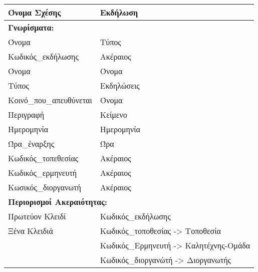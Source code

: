 \begin{tabular}{|p{6cm}|p{8cm}|}
  \hline
  Όνομα Σχέσης          & Εκδήλωση                              \\ \hline
  \multicolumn{2}{|l|}{\textbf{Γνωρίσματα:}}                    \\ \hline
  Όνομα                 & Τύπος                                 \\ \hline
  Κωδικός\_εκδήλωσης     & Ακέραιος                              \\ \hline
  Όνομα                 & Όνομα                                 \\ \hline
  Τύπος                 & Εκδηλώσεις                            \\ \hline
  Κοινό\_που\_απευθύνεται & Όνομα                                 \\ \hline
  Περιγραφή             & Κείμενο                               \\ \hline
  Ημερομηνία            & Ημερομηνία                            \\ \hline
  Ώρα\_έναρξης           & Ώρα                                   \\ \hline
  Κωδικός\_τοπεθεσίας    & Ακέραιος                              \\ \hline
  Κωδικός\_ερμηνευτή     & Ακέραιος                              \\ \hline
  Κωσικός\_διοργανωτή    & Ακέραιος                              \\ \hline
  \multicolumn{2}{|l|}{\textbf{Περιορισμοί Ακεραιότητας:}}      \\ \hline
  Πρωτεύον Κλειδί       & Κωδικός\_εκδήλωσης                     \\ \hline
  Ξένα Κλειδιά          & Κωδικός\_τοποθεσίας -> Τοποθεσία       \\ \cline{2-2}
                        & Κωδικός\_Ερμηνευτή -> Καλητέχνης-Ομάδα \\ \cline{2-2}
                        & Κωδικός\_διοργανώτή -> Διοργανωτής     \\ \hline
\end{tabular}

